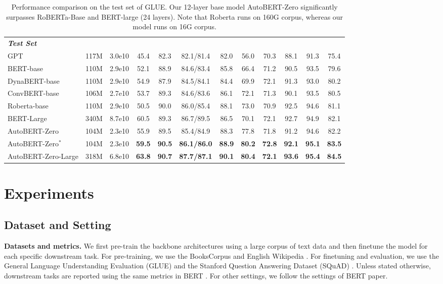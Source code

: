 \documentclass[letterpaper]{article} \usepackage{aaai22}  \usepackage{times}  \usepackage{helvet}  \usepackage{courier}  \usepackage[hyphens]{url}  \usepackage{graphicx} \urlstyle{rm} \def\UrlFont{\rm}  \usepackage{natbib}  \usepackage{caption} \DeclareCaptionStyle{ruled}{labelfont=normalfont,labelsep=colon,strut=off} \frenchspacing  \setlength{\pdfpagewidth}{8.5in}  \setlength{\pdfpageheight}{11in}  \usepackage{algorithm}
\begin{document}
\begin{table*}[t]
\begin{center}
{\begin{tabular}{lccccccccccc}
\hline
\hline
\multicolumn{12}{l}{\textbf{\textit{Test Set}}}
\tabularnewline
GPT\citep{radford2018improving} & 117M & 3.0e10 & 45.4 & 82.3 & 82.1/81.4 & 82.0 & 56.0 & 70.3 & 88.1 & 91.3 & 75.4 \tabularnewline
BERT-base\cite{devlin2019bert} & 110M  & 2.9e10 & 52.1  &88.9   & 84.6/83.4  & 85.8 &66.4 &71.2 & 90.5 &93.5&79.6 \tabularnewline
DynaBERT-base\cite{DBLP:conf/NeurIPS/HouHSJCL20} & 110M  & 2.9e10 & 54.9 & 87.9 &84.5/84.1 &84.4 &69.9 &{72.1} &{91.3} &93.0 & 80.2 \tabularnewline
ConvBERT-base \citep{jiang2020convbert} & 106M & 2.7e10  & 53.7 & 89.3 & 84.6/83.6 & 86.1 & 72.1 & 71.3 & 90.1 & 93.5 & 80.5 \tabularnewline
Roberta-base \citep{liu2019roberta} & 110M & 2.9e10 & 50.5 & 90.0 & 86.0/85.4 & 88.1 & 73.0 & 70.9 & 92.5 & 94.6 & 81.1 \tabularnewline
BERT-Large\cite{devlin2019bert} & 340M & 8.7e10 & 60.5 & 89.3 & 86.7/89.5 & 86.5 & 70.1 & 72.1 & 92.7 & 94.9 & 82.1 \tabularnewline
\hline
AutoBERT-Zero & 104M & 2.3e10 & {55.9} & {89.5} &{85.4/84.9} &{88.3} &{77.8} &71.8 &91.2& {94.6}  & {82.2} \tabularnewline
AutoBERT-Zero$^\ast$ & 104M & 2.3e10 & \textbf{59.5} & \textbf{90.5} & \textbf{86.1/86.0} & \textbf{88.9} & \textbf{80.2} & \textbf{72.8} & \textbf{92.1} & \textbf{95.1} & \textbf{83.5} \tabularnewline
AutoBERT-Zero-Large & 318M & 6.8e10 & \textbf{63.8} & \textbf{90.7} & \textbf{87.7/87.1}  & \textbf{90.1} & \textbf{80.4} & \textbf{72.1} & \textbf{93.6} & \textbf{95.4} & \textbf{84.5} \tabularnewline
\hline
\end{tabular}
}
\caption{Performance comparison on the test set of GLUE.
Our 12-layer base model AutoBERT-Zero significantly surpasses RoBERTa-Base and BERT-large (24 layers). Note that Roberta \citep{liu2019roberta} runs on 160G corpus, whereas our model runs on 16G corpus. }\label{tab:compare_on_glue_test} \end{center}
\end{table*}


\vspace{-1mm}
\section{Experiments}\label{sec:experiments}
\subsection{Dataset and Setting}\label{sec:implementation}
\textbf{Datasets and metrics.} We first pre-train the backbone architectures using a large corpus of text data and then finetune the model for each specific downstream task. For pre-training, we use the BooksCorpus \citep{zhu2015aligning} and English Wikipedia \citep{devlin2019bert}.
For finetuning and evaluation, we use the General Language Understanding Evaluation (GLUE) \citep{wang2018glue}
and the Stanford Question Answering Dataset (SQuAD) \citep{rajpurkar-etal-2016-squad}.
Unless stated otherwise, downstream tasks  are reported using the same metrics in BERT \citep{devlin2019bert}.
For other settings, we follow the settings of BERT paper.
\end{document}
